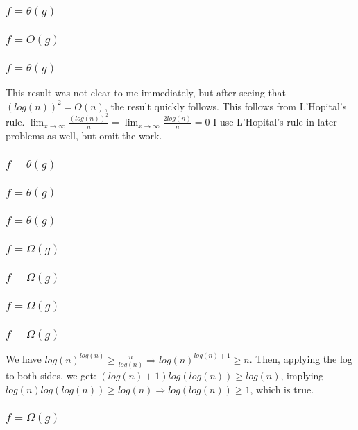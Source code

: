\documentclass{article}
\begin{document}
\subsubsection{$f = \theta(g)$}
\subsubsection{$f = O(g)$}
\subsubsection{$f = \theta(g)$}
This result was not clear to me immediately, but after seeing that $(log(n))^2 = O(n)$, the result quickly follows. This follows from L'Hopital's rule.  $\lim_{x\to\infty}\frac{(log(n))^2}{n}=\lim_{x\to\infty}\frac{2log(n)}{n}=0$
I use L'Hopital's rule in later problems as well, but omit the work. 
\subsubsection{$f = \theta(g)$}
\subsubsection{$f = \theta(g)$}
\subsubsection{$f = \theta(g)$}
\subsubsection{$f = \Omega(g)$}
\subsubsection{$f = \Omega(g)$}
\subsubsection{$f = \Omega(g)$}
\subsubsection{$f = \Omega(g)$}
We have $log(n)^{log(n)} \geq \frac{n}{log(n)} \Rightarrow log(n)^{log(n) + 1} \geq n$. Then, applying the log to both sides, we get: $(log(n) + 1)log(log(n)) \geq log(n)$, implying $log(n)log(log(n)) \geq log(n) \Rightarrow log(log(n)) \geq 1$, which is true. 
\subsubsection{$f = \Omega(g)$}
\end{document}
